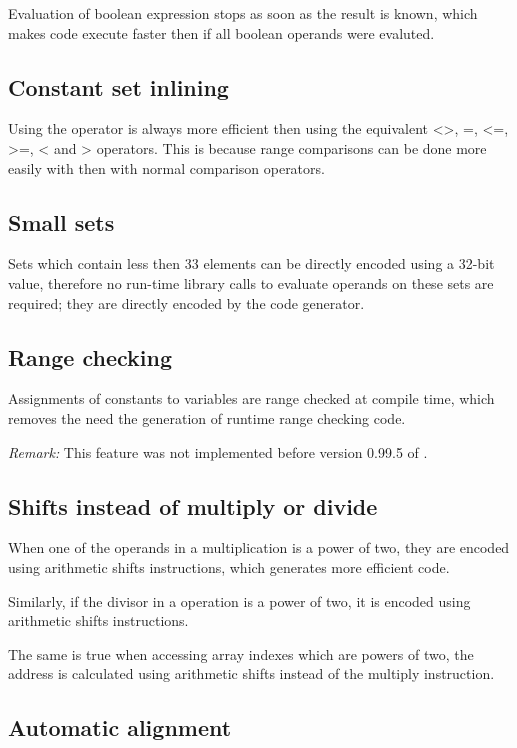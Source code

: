 \documentclass{report}
\begin{document}
Evaluation of boolean expression stops as soon as the result is
known, which makes code execute faster then if all boolean operands
were evaluted.

\subsection{ Constant set inlining }

Using the  operator is always more efficient then using the
equivalent <>, =, <=, >=, < and > operators. This is because
range comparisons can be done more easily with  then with
normal comparison operators.

\subsection{ Small sets }

Sets which contain less then 33 elements can be directly encoded
using a 32-bit value, therefore no run-time library calls to
evaluate operands on these sets are required; they are directly encoded
by the code generator.

\subsection{ Range checking }

Assignments of constants to variables are range checked at compile
time, which removes the need the generation of runtime range checking
code.

\emph{Remark:} This feature was not implemented before version
0.99.5 of \fpc.

\subsection{ Shifts instead of multiply or divide }

When one of the operands in a multiplication is a power of
two, they are encoded using arithmetic shifts instructions,
which generates more efficient code.

Similarly, if the divisor in a  operation is a power
of two, it is encoded using arithmetic shifts instructions.

The same is true when accessing array indexes which are
powers of two, the address is calculated using arithmetic
shifts instead of the multiply instruction.

\subsection{ Automatic alignment }
\end{document}
